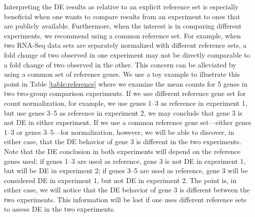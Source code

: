 \documentclass[letterpaper,12pt]{article}
\begin{document}
Interpreting the DE results as relative to an explicit reference set is
especially beneficial when one wants to compare results from an experiment to ones that are publicly available. 
Furthermore, when the interest is in comparing different experiments, we recommend using a common reference set. 
For example, when two RNA-Seq data sets are separately
normalized with different reference sets, a fold change of two observed in one
experiment may not be directly comparable to a fold change of two observed in
the other.  This concern can be alleviated by using a common set of reference
genes.  We use a toy example to illustrate this point in Table
\ref{table:reference} where we examine the mean counts for 5 genes in two
two-group comparison experiments. If we use different reference gene set for
count normalization, for example, we use genes 1--3 as reference in experiment
1, but use genes 3--5 as reference in experiment 2, we may conclude that gene
3 is not DE in either experiment. If we use a common reference gene
set---either genes 1--3 or genes 3--5---for normalization, however, we will be
able to discover, in either case, that the DE behavior of gene 3 is different
in the two experiments. Note that the DE conclusion in both experiments will
depend on the reference genes used: if genes 1--3 are used as reference, gene
3 is not DE in experiment 1, but will be DE in experiment 2; if genes 3--5 are
used as reference, gene 3 will be considered DE in experiment 1, but not DE in
experiment 2. The point is, in either case, we will notice that the DE
behavior of gene 3 is different between the two experiments. This information
will be lost if one uses different reference sets to assess DE in the two
experiments.


%
\end{document}

